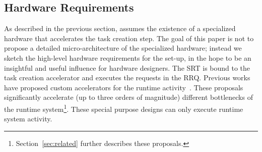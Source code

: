 \subsection{Hardware Requirements}
\label{sec:hw_req}

As described in the previous section, {\proposal} assumes the existence of a specialized hardware that accelerates the task creation step. 
The goal of this paper is not to propose a detailed micro-architecture of the specialized hardware; instead we sketch the high-level hardware requirements for the {\proposal} set-up, in the hope to be an insightful and useful influence for hardware designers.
The SRT is bound to the task creation accelerator and executes the requests in the RRQ. 
Previous works have proposed custom accelerators for the runtime activity~\cite{TaskSS, Xubin, Nexus, Swarm, TMU, Carbon}. 
These proposals significantly accelerate (up to three orders of magnitude) different bottlenecks of the runtime system\footnote{Section~\ref{sec:related} further describes these proposals.}. 
These special purpose designs can only execute runtime system activity.

\begin{figure}[t!]%
	\centering
	 \hspace{0.2cm}
	\caption{}
\end{figure}


